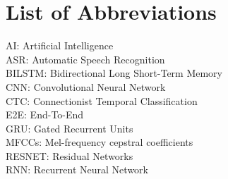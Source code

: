 \par

{
\KECadjusttocspacings %
\makeatletter
\def\@makeschapterhead#1{%
  {\newpage \parindent \z@ \raggedright
    \normalfont
    \interlinepenalty\@M
    \center \fontsize{16pt}{1} \bfseries \MakeUppercase{#1}\par\nobreak
    \vskip 18\p@ %
  }}
\makeatother 
\setcounter{secnumdepth}{5}

\tableofcontents %
\listoffigures %


\chapter*{List of Abbreviations}
	AI: Artificial Intelligence\\
	ASR: Automatic Speech Recognition\\
	BILSTM: Bidirectional Long Short-Term Memory\\
	CNN: Convolutional Neural Network \\
	CTC: Connectionist Temporal Classification\\
	E2E: End-To-End\\
	GRU: Gated Recurrent Units\\
	MFCCs:  Mel-frequency cepstral coefficients\\
	RESNET: Residual Networks\\	
	RNN: Recurrent Neural Network 
	
	
	

	
	
}


